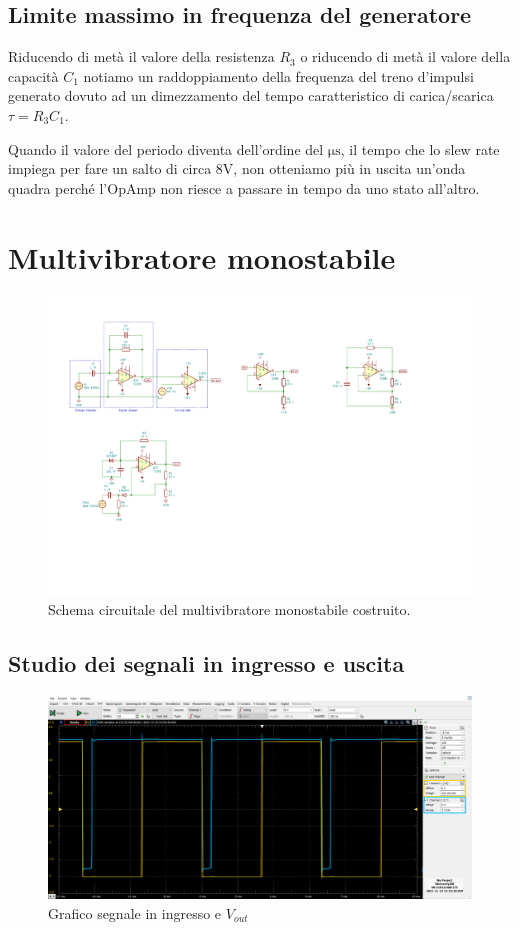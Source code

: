 \documentclass[10pt,a4paper]{article}
\begin{document}
\subsection{Limite massimo in frequenza del generatore}
Riducendo di metà il valore della resistenza $R_3$ o riducendo di metà il
valore della capacità $C_1$ notiamo un raddoppiamento della frequenza
del treno d'impulsi generato dovuto ad un dimezzamento del tempo
caratteristico di carica/scarica $\tau=R_3 C_1$.

Quando il valore del periodo diventa dell'ordine del $\si{\micro\s}$, il
tempo che lo slew rate impiega per fare un salto di circa $8$V, non
otteniamo più in uscita un'onda quadra perché l'OpAmp non riesce a passare
in tempo da uno stato all'altro.

\section{Multivibratore monostabile}
\begin{figure}[htbp]
    \centering
	\includegraphics[scale=1.2]{monostable}
    \caption{Schema circuitale del multivibratore monostabile costruito.
    \label{fig: monostableschm}}
\end{figure}

\subsection{Studio dei segnali in ingresso e uscita}
\begin{figure}[htbp]
\centering
\includegraphics[scale=0.42]{monostabile}
\caption{Grafico segnale in ingresso e $V_{out}$}
\end{figure}
\end{document}
